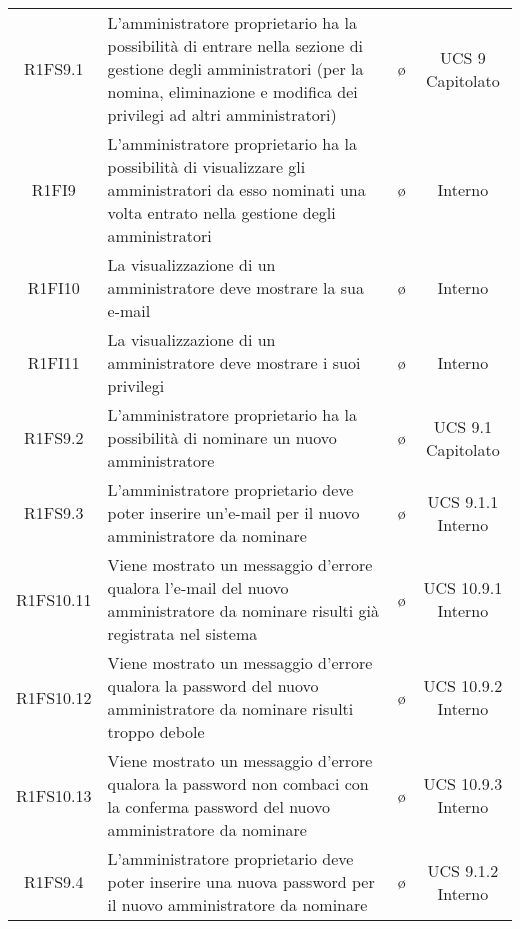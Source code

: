 {\begin{longtable}{ c C{8cm} c c}



R1FS9.1 & L'amministratore proprietario ha la possibilità di entrare nella sezione di gestione degli amministratori (per la nomina, eliminazione e modifica dei privilegi ad altri amministratori) & \o & UCS 9 Capitolato \\

R1FI9 & L'amministratore proprietario ha la possibilità di visualizzare gli amministratori da esso nominati una volta entrato nella gestione degli amministratori & \o & Interno \\

R1FI10 & La visualizzazione di un amministratore deve mostrare la sua e-mail & \o & Interno \\

R1FI11 & La visualizzazione di un amministratore deve mostrare i suoi privilegi & \o & Interno \\

R1FS9.2 & L'amministratore proprietario ha la possibilità di nominare un nuovo amministratore & \o & UCS 9.1 Capitolato\\

R1FS9.3 & L'amministratore proprietario deve poter inserire un'e-mail per il nuovo amministratore da nominare & \o & UCS 9.1.1 Interno\\

R1FS10.11 & Viene mostrato un messaggio d'errore qualora l'e-mail del nuovo amministratore da nominare risulti già registrata nel sistema & \o & UCS 10.9.1 Interno\\

R1FS10.12 & Viene mostrato un messaggio d'errore qualora la password del nuovo amministratore da nominare risulti troppo debole & \o & UCS 10.9.2 Interno\\

R1FS10.13 & Viene mostrato un messaggio d'errore qualora la password non combaci con la conferma password del nuovo amministratore da nominare & \o & UCS 10.9.3 Interno\\

R1FS9.4 & L'amministratore proprietario deve poter inserire una nuova password per il nuovo amministratore da nominare & \o & UCS 9.1.2 Interno\\


\end{longtable}}

